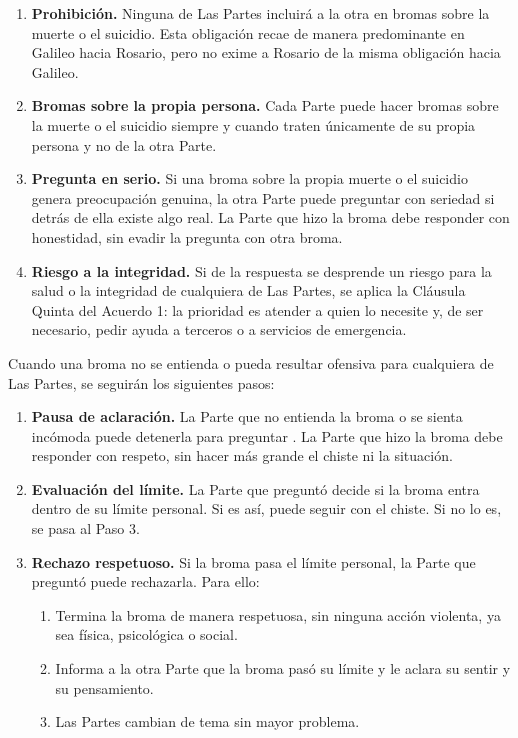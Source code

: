 \begin{enumerate}[label=\arabic*., leftmargin=*, itemsep=0.3em]
  \item \textbf{Prohibición.} Ninguna de Las Partes incluirá a la otra en bromas sobre la muerte o el suicidio. Esta obligación recae de manera predominante en Galileo hacia Rosario, pero no exime a Rosario de la misma obligación hacia Galileo.

  \item \textbf{Bromas sobre la propia persona.} Cada Parte puede hacer bromas sobre la muerte o el suicidio siempre y cuando traten únicamente de su propia persona y no de la otra Parte.

  \item \textbf{Pregunta en serio.} Si una broma sobre la propia muerte o el suicidio genera preocupación genuina, la otra Parte puede preguntar con seriedad si detrás de ella existe algo real. La Parte que hizo la broma debe responder con honestidad, sin evadir la pregunta con otra broma.

  \item \textbf{Riesgo a la integridad.} Si de la respuesta se desprende un riesgo para la salud o la integridad de cualquiera de Las Partes, se aplica la Cláusula Quinta del Acuerdo 1: la prioridad es atender a quien lo necesite y, de ser necesario, pedir ayuda a terceros o a servicios de emergencia.
\end{enumerate}


Cuando una broma no se entienda o pueda resultar ofensiva para cualquiera de Las Partes, se seguirán los siguientes pasos:

\begin{enumerate}[label=\textbf{Paso \arabic*.}, leftmargin=*, itemsep=0.3em]
  \item \textbf{Pausa de aclaración.} La Parte que no entienda la broma o se sienta incómoda puede detenerla para preguntar . La Parte que hizo la broma debe responder con respeto, sin hacer más grande el chiste ni la situación.

  \item \textbf{Evaluación del límite.} La Parte que preguntó decide si la broma entra dentro de su límite personal. Si es así, puede seguir con el chiste. Si no lo es, se pasa al Paso 3.

  \item \textbf{Rechazo respetuoso.} Si la broma pasa el límite personal, la Parte que preguntó puede rechazarla. Para ello:
  \begin{enumerate}[label=\alph*), itemsep=0.2em]
    \item Termina la broma de manera respetuosa, sin ninguna acción violenta, ya sea física, psicológica o social.
    \item Informa a la otra Parte que la broma pasó su límite y le aclara su sentir y su pensamiento.
    \item Las Partes cambian de tema sin mayor problema.
  \end{enumerate}
\end{enumerate}

